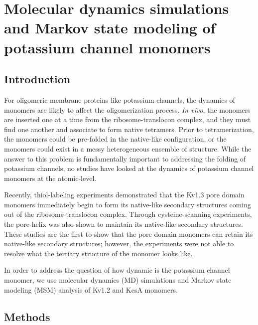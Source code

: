 
\chapter{Molecular dynamics simulations and Markov state modeling of potassium channel monomers}

\section{Introduction}
For oligomeric membrane proteins like potassium channels, the dynamics of monomers are likely to affect the oligomerization process. \textit{In vivo}, the monomers are inserted one at a time from the ribosome-translocon complex, and they must find one another and associate to form native tetramers. Prior to tetramerization, the monomers could be pre-folded in the native-like configuration, or the monomers could exist in a messy heterogeneous ensemble of structure. While the answer to this problem is fundamentally important to addressing the folding of potassium channels, no studies have looked at the dynamics of potassium channel monomers at the atomic-level.

Recently, thiol-labeling experiments demonstrated that the Kv1.3 pore domain monomers immediately begin to form its native-like secondary structures coming out of the ribosome-translocon complex.  \citep{gajewski2011} Through cysteine-scanning experiments, the pore-helix was also shown to maintain its native-like secondary structures. \citep{delaney2014} These studies are the first to show that the pore domain monomers can retain its native-like secondary structures; however, the experiments were not able to resolve what the tertiary structure of the monomer looks like.

In order to address the question of how dynamic is the potassium channel monomer, we use molecular dynamics (MD) simulations and Markov state modeling (MSM) analysis of Kv1.2 and KcsA monomers.

\section{Methods}
